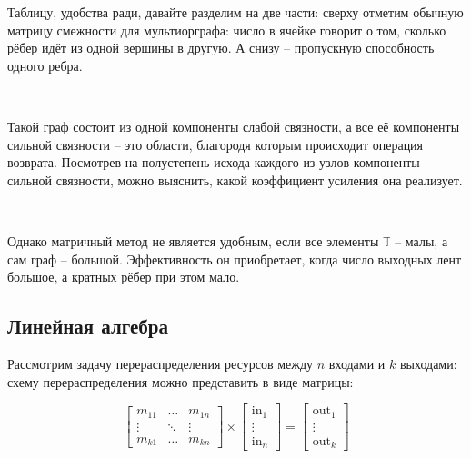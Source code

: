 \vspace{0.5in}

Таблицу, удобства ради, давайте разделим на две части: сверху отметим обычную матрицу смежности для мультиорграфа: число в ячейке говорит о том, сколько рёбер идёт из одной вершины в другую. А снизу -- пропускную способность одного ребра.

\

Такой граф состоит из одной компоненты слабой связности, а все её компоненты сильной связности -- это области, благородя которым происходит операция возврата. Посмотрев на полустепень исхода каждого из узлов компоненты сильной связности, можно выяснить, какой коэффициент усиления она реализует.

\

Однако матричный метод не является удобным, если все элементы $\mathbb{T}$ -- малы, а сам граф -- большой. Эффективность он приобретает, когда число выходных лент большое, а кратных рёбер при этом мало.













\vspace{0.5in}

\subsection{Линейная алгебра}

Рассмотрим задачу перераспределения ресурсов между $n$ входами и $k$ выходами: схему перераспределения можно представить в виде матрицы:

$$
\left[
\begin{matrix}
	m_{11} & \ldots & m_{1n} \\
	\vdots & \ddots & \vdots \\
	m_{k1} & \ldots & m_{kn}
\end{matrix}
\right]
\times
\left[
\begin{matrix}
	\text{in}_1 \\
	\vdots \\
	\text{in}_n
\end{matrix}
\right]
=
\left[
\begin{matrix}
	\text{out}_1 \\
	\vdots \\
	\text{out}_k
\end{matrix}
\right]
$$

